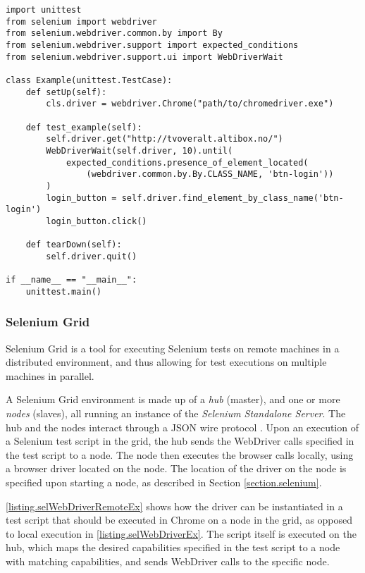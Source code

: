 \vspace{4mm}
\noindent\begin{minipage}{\textwidth}
\begin{lstlisting}[caption=Example Selenium Test Script, label={listing.selWebDriverEx}]
import unittest
from selenium import webdriver
from selenium.webdriver.common.by import By
from selenium.webdriver.support import expected_conditions
from selenium.webdriver.support.ui import WebDriverWait

class Example(unittest.TestCase):
    def setUp(self):
        cls.driver = webdriver.Chrome("path/to/chromedriver.exe")

    def test_example(self):
        self.driver.get("http://tvoveralt.altibox.no/")
        WebDriverWait(self.driver, 10).until(
            expected_conditions.presence_of_element_located(
                (webdriver.common.by.By.CLASS_NAME, 'btn-login'))
        )
        login_button = self.driver.find_element_by_class_name('btn-login')
        login_button.click()

    def tearDown(self):
        self.driver.quit()

if __name__ == "__main__":
    unittest.main()
\end{lstlisting}
\end{minipage}








\subsubsection{Selenium Grid}\label{subsubsec.seleniumGrid}
Selenium Grid is a tool for executing Selenium tests on remote machines in a distributed environment, and thus allowing for test executions on multiple machines in parallel.

A Selenium Grid environment is made up of a \emph{hub} (master), and one or more \emph{nodes} (slaves), all running an instance of the \emph{Selenium Standalone Server}. The hub and the nodes interact through a JSON wire protocol \cite{selGrid}. Upon an execution of a Selenium test script in the grid, the hub sends the WebDriver calls specified in the test script to a node. The node then executes the browser calls locally, using a browser driver located on the node. The location of the driver on the node is specified upon starting a node, as described in Section \ref{section.selenium}.

\lstlistingname \space \ref{listing.selWebDriverRemoteEx} shows how the driver can be instantiated in a test script that should be executed in Chrome on a node in the grid, as opposed to local execution in \lstlistingname \space \ref{listing.selWebDriverEx}. The script itself is executed on the hub, which maps the desired capabilities specified in the test script to a node with matching capabilities, and sends WebDriver calls to the specific node.

